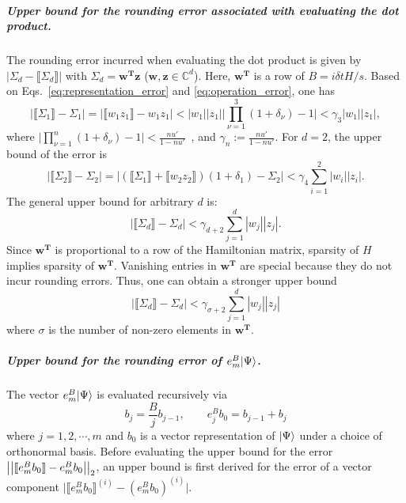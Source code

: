 \subparagraph{Upper bound for the rounding error associated with evaluating the dot product.}
The rounding error incurred when evaluating the dot product is given by $|\Sigma_d-\llbracket \Sigma_d\rrbracket|$ with $\Sigma_d=\boldsymbol{w^\text{T}z}$ ($\boldsymbol{w},\boldsymbol {z} \in\mathbb{C}^{d}$). Here, $\boldsymbol{w^\text{T}}$ is a row of $B=i\delta t H/s$. Based on Eqs.~\eqref{eq:representation_error} and \eqref{eq:operation_error}, one has
\begin{equation}
\label{eq:c7}
    |\llbracket \Sigma_1\rrbracket-\Sigma_1|=|\llbracket w_1  z_1\rrbracket-w_1z_1|<|w_1||z_1|\big|\prod_{\nu=1}^3(1+\delta_\nu)-1\big|<\gamma_3 |w_1||z_1|,
\end{equation}
where $\big|\prod_{\nu=1}^n(1+\delta_\nu)-1\big|<\frac{nu'}{1-nu'}$~\cite{higham2002accuracy}, and $\gamma_n:=\frac{nu'}{1-nu'}$. For $d=2$, the upper bound of the error is
\begin{equation}
\label{eq:c8}
     |\llbracket \Sigma_2\rrbracket-\Sigma_2|=|(\llbracket \Sigma_1\rrbracket+\llbracket w_2 z_2\rrbracket )(1+\delta_1)-\Sigma_2|<\gamma_4\sum_{i=1}^2|w_i||z_i|.
\end{equation}
The general upper bound for arbitrary $d$ is:
\begin{equation}
    |\llbracket \Sigma_d\rrbracket-\Sigma_d| <\gamma_{d+2}\sum_{j=1}^{d}|w_j|| z_j|.
\end{equation}
Since $\boldsymbol{w^\text{T}}$ is proportional to a row of the Hamiltonian matrix, sparsity of $H$ implies sparsity of $\boldsymbol{w^\text{T}}$. Vanishing entries in $\boldsymbol{w^\text{T}}$ are special because they do not incur rounding errors. Thus, one can obtain a stronger upper bound
\begin{equation}
\label{eq:C10}
    |\llbracket \Sigma_d\rrbracket-\Sigma_d|<\gamma_{\sigma+2}\sum_{j=1}^{d}|w_j|| z_j|
\end{equation}
where $\sigma$ is the number of non-zero elements in $\boldsymbol{w^\text{T}}$.

\subparagraph{Upper bound for the rounding error of $e^B_m|\Psi\rangle$.}
The vector $e^B_m|\Psi\rangle$ is evaluated recursively via
\begin{equation}
\label{eq:recursive_relation_1}
    b_j= \frac{B}{j}b_{j-1},\qquad e^B_j b_0=b_{j-1}+b_j
\end{equation}
where $j=1,2,\cdots,m$ and $b_0$ is a vector representation of $|\Psi\rangle$ under a choice of orthonormal basis. Before evaluating the upper bound for the error $\left|\left|\llbracket e^B_mb_0\rrbracket-e^B_mb_0\right|\right|_2$, an upper bound is first derived for the error of a vector component $\big|\llbracket e^B_mb_0 \rrbracket^{(i)}-(e^B_mb_0) ^{(i)}\big|$.

